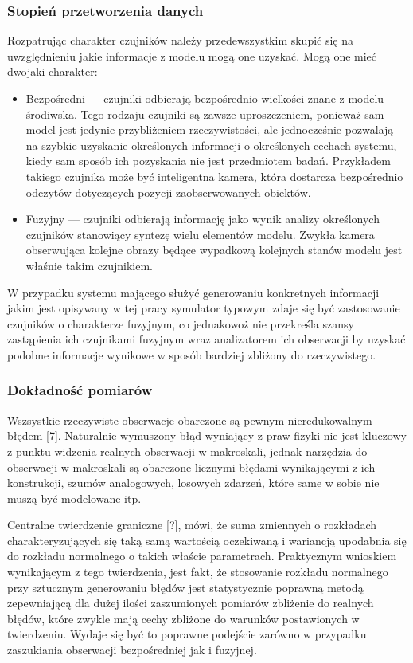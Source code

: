 {\subsubsection{Stopień przetworzenia danych}
\par{
Rozpatrując charakter czujników należy przedewszystkim skupić się na uwzględnieniu jakie informacje z modelu mogą one uzyskać. Mogą one mieć dwojaki charakter:
\begin{itemize}
\item Bezpośredni --- czujniki odbierają bezpośrednio wielkości znane z modelu środiwska. Tego rodzaju czujniki są zawsze uproszczeniem, ponieważ sam model jest jedynie przybliżeniem rzeczywistości, ale jednocześnie pozwalają na szybkie uzyskanie określonych informacji o określonych cechach systemu, kiedy sam sposób ich pozyskania nie jest przedmiotem badań. Przykładem takiego czujnika może być inteligentna kamera, która dostarcza bezpośrednio odczytów dotyczących pozycji zaobserwowanych obiektów.
\item Fuzyjny --- czujniki odbierają informację jako wynik analizy określonych czujników stanowiący syntezę wielu elementów modelu. Zwykła kamera obserwująca kolejne obrazy będące wypadkową kolejnych stanów modelu jest właśnie takim czujnikiem.
\end{itemize}
W przypadku systemu mającego służyć generowaniu konkretnych informacji jakim jest opisywany w tej pracy symulator typowym zdaje się być zastosowanie czujników o charakterze fuzyjnym, co jednakowoż nie przekreśla szansy zastąpienia ich czujnikami fuzyjnym wraz analizatorem ich obserwacji by uzyskać podobne informacje wynikowe w sposób bardziej zbliżony do rzeczywistego.

\subsubsection{Dokładność pomiarów}
\par{
Wszsystkie rzeczywiste obserwacje obarczone są pewnym nieredukowalnym błędem [7]. Naturalnie wymuszony błąd wyniający z praw fizyki nie jest kluczowy z punktu widzenia realnych obserwacji w makroskali, jednak narzędzia do obserwacji w makroskali są obarczone licznymi błędami wynikającymi z ich konstrukcji, szumów analogowych, losowych zdarzeń, które same w sobie nie muszą być modelowane itp.
}
\par{
Centralne twierdzenie graniczne [?], mówi, że suma zmiennych o rozkładach charakteryzujących się taką samą wartością oczekiwaną i wariancją upodabnia się do rozkładu normalnego o takich właście parametrach. Praktycznym wnioskiem wynikającym z tego twierdzenia, jest fakt, że stosowanie rozkładu normalnego przy sztucznym generowaniu błędów jest statystycznie poprawną metodą zepewniającą dla dużej ilości zaszumionych pomiarów zbliżenie do realnych błędów, które zwykle mają cechy zbliżone do warunków postawionych w twierdzeniu. Wydaje się być to poprawne podejście zarówno w przypadku zaszukiania obserwacji bezpośredniej jak i fuzyjnej.
}

}}
